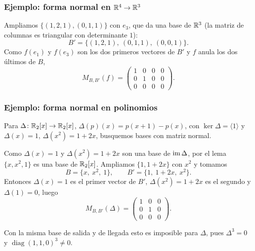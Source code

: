 \begin{frame}
    \frametitle{Ejemplo: forma normal en $\mathbb{R}^4\to\mathbb{R}^3$}

    Ampliamos $\{(1,2,1),(0,1,1)\}$ con $e_3$, que da una base de $\mathbb{R}^3$
    (la matriz de columnas es triangular con determinante $1$):
    \[
        B'=\{(1,2,1),\ (0,1,1),\ (0,0,1)\}.
    \]
    Como $f(e_1)$ y $f(e_3)$ son los dos primeros vectores de $B'$ y
    $f$ anula los dos últimos de $B$,
    \[
        M_{B,B'}(f)=\begin{pmatrix}1&0&0&0\\0&1&0&0\\0&0&0&0\end{pmatrix}.
    \]
\end{frame}


\begin{frame}
    \frametitle{Ejemplo: forma normal en polinomios}

    \begin{example}
        Para $\Delta\colon\mathbb{R}_2[x]\to\mathbb{R}_2[x]$, $\Delta(p)(x)=p(x+1)-p(x)$,
        con $\ker\Delta=\langle1\rangle$ y $\Delta(x)=1$,
        $\Delta(x^2)=1+2x$, busquemos bases con matriz normal.
    \end{example}

    Como $\Delta(x)=1$ y $\Delta(x^2)=1+2x$ son una base de $\operatorname{im}\Delta$,
    por el lema $\{x,x^2,1\}$ es una base de $\mathbb{R}_2[x]$. Ampliamos
    $\{1,1+2x\}$ con $x^2$ y tomamos
    \[
        B=\{x,\ x^2,\ 1\},\qquad B'=\{1,\ 1+2x,\ x^2\}.
    \]
    Entonces $\Delta(x)=1$ es el primer vector de $B'$, $\Delta(x^2)=1+2x$
    es el segundo y $\Delta(1)=0$, luego
    \[
        M_{B,B'}(\Delta)=\begin{pmatrix}1&0&0\\0&1&0\\0&0&0\end{pmatrix}.
    \]

    Con la \alert{misma} base de salida y de llegada esto es imposible
    para $\Delta$, pues $\Delta^3=0$ y $\operatorname{diag}(1,1,0)^3\neq0$.
\end{frame}
